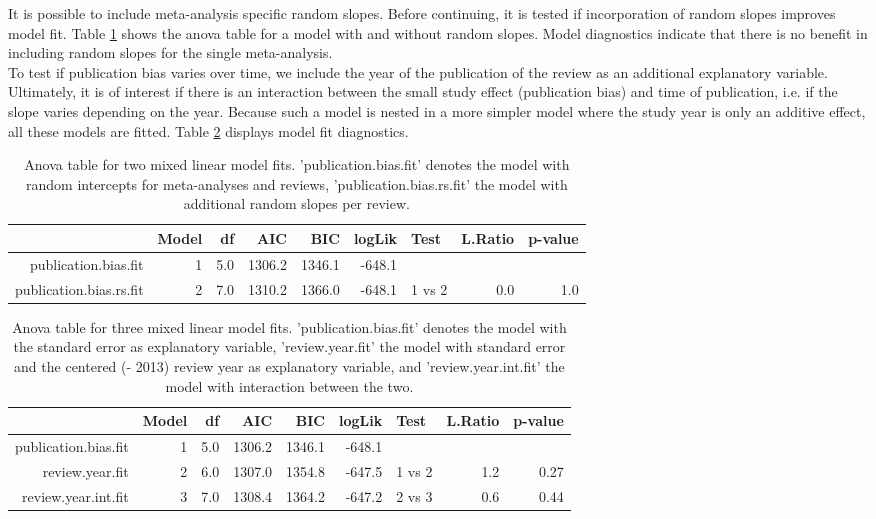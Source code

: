 \documentclass[11pt,a4paper,twoside]{book}\usepackage[]{graphicx}\usepackage[]{color}
\begin{document}
It is possible to include meta-analysis specific random slopes. Before continuing, it is tested if incorporation of random slopes improves model fit. Table \ref{anova.random.slopes} shows the anova table for a model with and without random slopes. Model diagnostics indicate that there is no benefit in including random slopes for the single meta-analysis. \\
To test if publication bias varies over time, we include the year of the publication of the review as an additional explanatory variable. Ultimately, it is of interest if there is an interaction between the small study effect (publication bias) and time of publication, i.e. if the slope varies depending on the year. Because such a model is nested in a more simpler model where the study year is only an additive effect, all these models are fitted. Table \ref{anova.lme} displays model fit diagnostics.

\begin{table}[ht]
\centering
\begingroup\scriptsize
\begin{tabular}{rrrrrrlrr}
  \hline
 & Model & df & AIC & BIC & logLik & Test & L.Ratio & p-value \\ 
  \hline
publication.bias.fit &  1 & 5.0 & 1306.2 & 1346.1 & -648.1 &  &  &  \\ 
  publication.bias.rs.fit &  2 & 7.0 & 1310.2 & 1366.0 & -648.1 & 1 vs 2 & 0.0 & 1.0 \\ 
   \hline
\end{tabular}
\endgroup
\caption{Anova table for two mixed linear model fits. 'publication.bias.fit' denotes the model with random intercepts for meta-analyses and reviews, 'publication.bias.rs.fit' the model with additional random slopes per review.} 
\label{anova.random.slopes}
\end{table}





\begin{table}[ht]
\centering
\begingroup\scriptsize
\begin{tabular}{rrrrrrlrr}
  \hline
 & Model & df & AIC & BIC & logLik & Test & L.Ratio & p-value \\ 
  \hline
publication.bias.fit &  1 & 5.0 & 1306.2 & 1346.1 & -648.1 &  &  &  \\ 
  review.year.fit &  2 & 6.0 & 1307.0 & 1354.8 & -647.5 & 1 vs 2 & 1.2 & 0.27 \\ 
  review.year.int.fit &  3 & 7.0 & 1308.4 & 1364.2 & -647.2 & 2 vs 3 & 0.6 & 0.44 \\ 
   \hline
\end{tabular}
\endgroup
\caption{Anova table for three mixed linear model fits. 'publication.bias.fit' denotes the model with the standard error as explanatory variable, 'review.year.fit' the model with standard error and the centered (- 2013) review year as explanatory variable, and 'review.year.int.fit' the model with interaction between the two.} 
\label{anova.lme}
\end{table}
\end{document}
